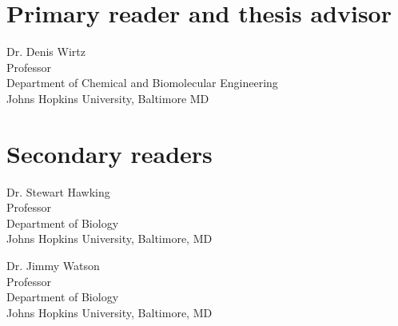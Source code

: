 \begin{singlespace}

    \section*{Primary reader and thesis advisor}
    
    Dr. Denis Wirtz \\
    Professor\\
    Department of Chemical and Biomolecular Engineering\\
    Johns Hopkins University, Baltimore MD 


    \section*{Secondary readers}
    
    Dr. Stewart Hawking\\
    Professor\\
    Department of Biology \\
    Johns Hopkins University, Baltimore, MD 
    
    \vspace{0.1in}
    
    Dr. Jimmy Watson \\
    Professor\\
    Department of Biology \\
    Johns Hopkins University, Baltimore, MD 



\end{singlespace}
